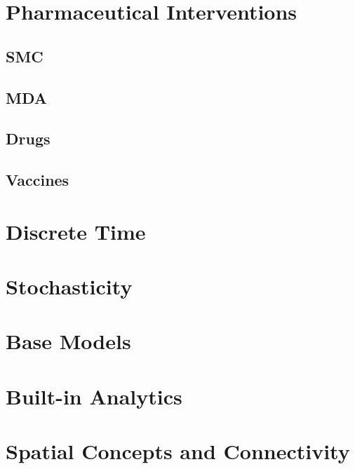 \documentclass[
]{book}
\begin{document}
\hypertarget{pharmaceutical-interventions-1}{%
\chapter{Pharmaceutical Interventions}\label{pharmaceutical-interventions-1}}

\hypertarget{smc-1}{%
\section{SMC}\label{smc-1}}

\hypertarget{mda-1}{%
\section{MDA}\label{mda-1}}

\hypertarget{drugs-1}{%
\section{Drugs}\label{drugs-1}}

\hypertarget{vaccines-1}{%
\section{Vaccines}\label{vaccines-1}}

\hypertarget{discrete-time}{%
\chapter{Discrete Time}\label{discrete-time}}

\hypertarget{stochasticity}{%
\chapter{Stochasticity}\label{stochasticity}}

\hypertarget{base-models}{%
\chapter{Base Models}\label{base-models}}

\hypertarget{built-in-analytics}{%
\chapter{Built-in Analytics}\label{built-in-analytics}}

\hypertarget{spatial-concepts-and-connectivity}{%
\chapter{Spatial Concepts and Connectivity}\label{spatial-concepts-and-connectivity}}
\end{document}

